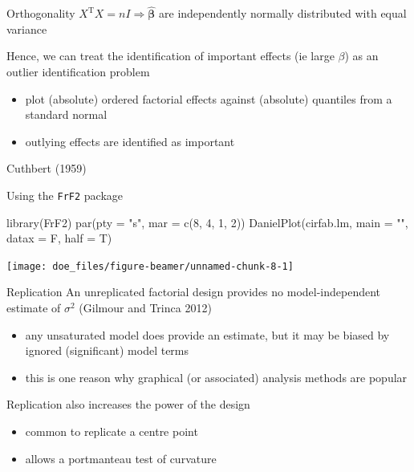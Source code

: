 \documentclass[
  ignorenonframetext,
]{beamer}
\newenvironment{Shaded}{\begin{snugshade}}{\end{snugshade}}
\newcommand{\AttributeTok}[1]{\textcolor[rgb]{0.77,0.63,0.00}{#1}}
\newcommand{\DecValTok}[1]{\textcolor[rgb]{0.00,0.00,0.81}{#1}}
\newcommand{\FunctionTok}[1]{\textcolor[rgb]{0.00,0.00,0.00}{#1}}
\newcommand{\NormalTok}[1]{#1}
\newcommand{\StringTok}[1]{\textcolor[rgb]{0.31,0.60,0.02}{#1}}
\providecommand{\tightlist}{%
  \setlength{\itemsep}{0pt}\setlength{\parskip}{0pt}}
\begin{document}
\begin{frame}{Orthogonality}
\protect\hypertarget{orthogonality}{}
\(X^\mathrm{T}X = nI \Rightarrow \hat{\boldsymbol{\beta}}\) are
independently normally distributed with equal variance

Hence, we can treat the identification of important effects (ie large
\(\beta\)) as an outlier identification problem

\begin{itemize}
\tightlist
\item
  plot (absolute) ordered factorial effects against (absolute) quantiles
  from a standard normal
\item
  outlying effects are identified as important
\end{itemize}

Cuthbert (1959)
\end{frame}

\begin{frame}[fragile]{}
\protect\hypertarget{section-8}{}
Using the \texttt{FrF2} package

\begin{Shaded}
\begin{Highlighting}[]
\FunctionTok{library}\NormalTok{(FrF2)}
\FunctionTok{par}\NormalTok{(}\AttributeTok{pty =} \StringTok{"s"}\NormalTok{, }\AttributeTok{mar =} \FunctionTok{c}\NormalTok{(}\DecValTok{8}\NormalTok{, }\DecValTok{4}\NormalTok{, }\DecValTok{1}\NormalTok{, }\DecValTok{2}\NormalTok{))}
\FunctionTok{DanielPlot}\NormalTok{(cirfab.lm, }\AttributeTok{main =} \StringTok{""}\NormalTok{, }\AttributeTok{datax =}\NormalTok{ F, }\AttributeTok{half =}\NormalTok{ T)}
\end{Highlighting}
\end{Shaded}

\texttt{[image: doe\_files/figure-beamer/unnamed-chunk-8-1]}
\end{frame}

\begin{frame}{Replication}
\protect\hypertarget{replication}{}
An unreplicated factorial design provides no model-independent estimate
of \(\sigma^2\) (Gilmour and Trinca 2012)

\begin{itemize}
\tightlist
\item
  any unsaturated model does provide an estimate, but it may be biased
  by ignored (significant) model terms
\item
  this is one reason why graphical (or associated) analysis methods are
  popular
\end{itemize}

Replication also increases the power of the design

\begin{itemize}
\tightlist
\item
  common to replicate a centre point
\item
  allows a portmanteau test of curvature
\end{itemize}
\end{frame}
\end{document}
